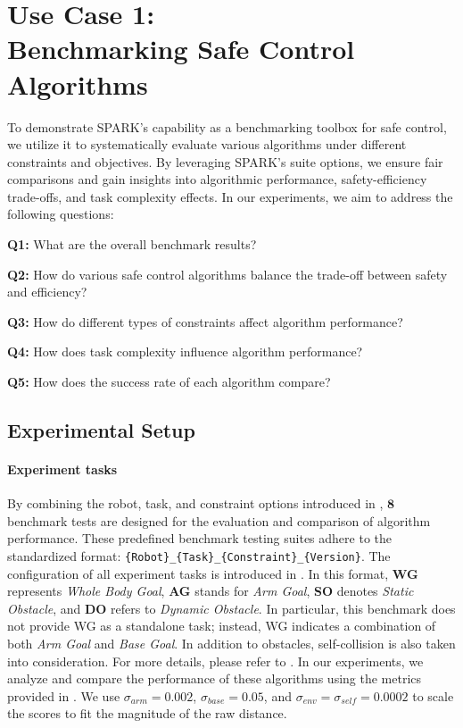\section{Use Case 1: \\Benchmarking Safe Control Algorithms} \label{sec: usecase_benchmark}


To demonstrate SPARK’s capability as a benchmarking toolbox for safe control, we utilize it to systematically evaluate various algorithms under different constraints and objectives. By leveraging SPARK’s suite options, we ensure fair comparisons and gain insights into algorithmic performance, safety-efficiency trade-offs, and task complexity effects.  In our experiments, we aim to address the following questions:  

\textbf{Q1:}  
What are the overall benchmark results?  

\textbf{Q2:}  
How do various safe control algorithms balance the trade-off between safety and efficiency?  

\textbf{Q3:}  
How do different types of constraints affect algorithm performance?  

\textbf{Q4:}  
How does task complexity influence algorithm performance?  

\textbf{Q5:}  
How does the success rate of each algorithm compare?



\subsection{Experimental Setup}  
\paragraph{Experiment tasks}
By combining the robot, task, and constraint options introduced in , $\textbf{8}$ benchmark tests are designed for the evaluation and comparison of algorithm performance. These predefined benchmark testing suites adhere to the standardized format: \texttt{\{Robot\}\_\{Task\}\_\{Constraint\}\_\{Version\}}. The configuration of all experiment tasks is introduced in . In this format, \textbf{WG} represents \textit{Whole Body Goal}, \textbf{AG} stands for \textit{Arm Goal}, \textbf{SO} denotes \textit{Static Obstacle}, and \textbf{DO} refers to \textit{Dynamic Obstacle}. In particular, this benchmark does not provide WG as a standalone task; instead, WG indicates a combination of both \textit{Arm Goal} and \textit{Base Goal}. In addition to obstacles, self-collision is also taken into consideration. For more details, please refer to . In our experiments, we analyze and compare the performance of these algorithms using the metrics provided in .
We use $\sigma_{arm} = 0.002$, $\sigma_{base} = 0.05$, and $\sigma_{env} =\sigma_{self} = 0.0002$ to scale the scores to fit the magnitude of the raw distance. 



